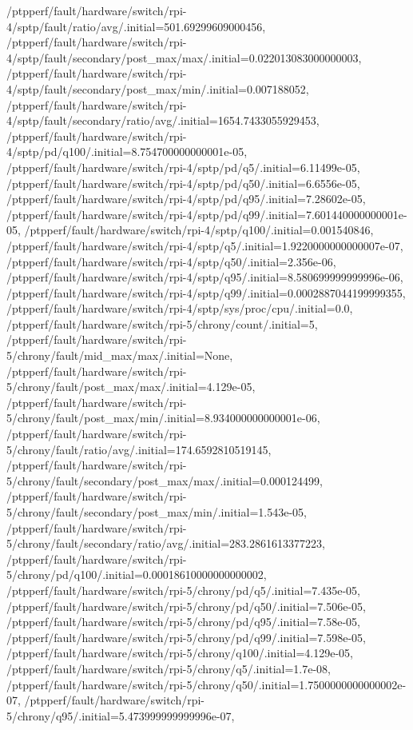 {    /ptpperf/fault/hardware/switch/rpi-4/sptp/fault/ratio/avg/.initial=501.69299609000456,
    /ptpperf/fault/hardware/switch/rpi-4/sptp/fault/secondary/post_max/max/.initial=0.022013083000000003,
    /ptpperf/fault/hardware/switch/rpi-4/sptp/fault/secondary/post_max/min/.initial=0.007188052,
    /ptpperf/fault/hardware/switch/rpi-4/sptp/fault/secondary/ratio/avg/.initial=1654.7433055929453,
    /ptpperf/fault/hardware/switch/rpi-4/sptp/pd/q100/.initial=8.754700000000001e-05,
    /ptpperf/fault/hardware/switch/rpi-4/sptp/pd/q5/.initial=6.11499e-05,
    /ptpperf/fault/hardware/switch/rpi-4/sptp/pd/q50/.initial=6.6556e-05,
    /ptpperf/fault/hardware/switch/rpi-4/sptp/pd/q95/.initial=7.28602e-05,
    /ptpperf/fault/hardware/switch/rpi-4/sptp/pd/q99/.initial=7.601440000000001e-05,
    /ptpperf/fault/hardware/switch/rpi-4/sptp/q100/.initial=0.001540846,
    /ptpperf/fault/hardware/switch/rpi-4/sptp/q5/.initial=1.9220000000000007e-07,
    /ptpperf/fault/hardware/switch/rpi-4/sptp/q50/.initial=2.356e-06,
    /ptpperf/fault/hardware/switch/rpi-4/sptp/q95/.initial=8.580699999999996e-06,
    /ptpperf/fault/hardware/switch/rpi-4/sptp/q99/.initial=0.0002887044199999355,
    /ptpperf/fault/hardware/switch/rpi-4/sptp/sys/proc/cpu/.initial=0.0,
    /ptpperf/fault/hardware/switch/rpi-5/chrony/count/.initial=5,
    /ptpperf/fault/hardware/switch/rpi-5/chrony/fault/mid_max/max/.initial=None,
    /ptpperf/fault/hardware/switch/rpi-5/chrony/fault/post_max/max/.initial=4.129e-05,
    /ptpperf/fault/hardware/switch/rpi-5/chrony/fault/post_max/min/.initial=8.934000000000001e-06,
    /ptpperf/fault/hardware/switch/rpi-5/chrony/fault/ratio/avg/.initial=174.6592810519145,
    /ptpperf/fault/hardware/switch/rpi-5/chrony/fault/secondary/post_max/max/.initial=0.000124499,
    /ptpperf/fault/hardware/switch/rpi-5/chrony/fault/secondary/post_max/min/.initial=1.543e-05,
    /ptpperf/fault/hardware/switch/rpi-5/chrony/fault/secondary/ratio/avg/.initial=283.2861613377223,
    /ptpperf/fault/hardware/switch/rpi-5/chrony/pd/q100/.initial=0.00018610000000000002,
    /ptpperf/fault/hardware/switch/rpi-5/chrony/pd/q5/.initial=7.435e-05,
    /ptpperf/fault/hardware/switch/rpi-5/chrony/pd/q50/.initial=7.506e-05,
    /ptpperf/fault/hardware/switch/rpi-5/chrony/pd/q95/.initial=7.58e-05,
    /ptpperf/fault/hardware/switch/rpi-5/chrony/pd/q99/.initial=7.598e-05,
    /ptpperf/fault/hardware/switch/rpi-5/chrony/q100/.initial=4.129e-05,
    /ptpperf/fault/hardware/switch/rpi-5/chrony/q5/.initial=1.7e-08,
    /ptpperf/fault/hardware/switch/rpi-5/chrony/q50/.initial=1.7500000000000002e-07,
    /ptpperf/fault/hardware/switch/rpi-5/chrony/q95/.initial=5.473999999999996e-07,
}
